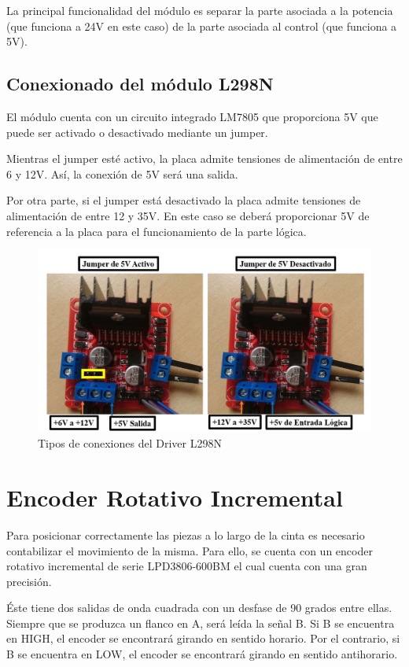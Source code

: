 La principal funcionalidad del módulo es separar la parte asociada
a la potencia (que funciona a 24V en este caso) de la parte asociada
al control (que funciona a 5V).

\subsection{Conexionado del módulo L298N}

El módulo cuenta con un circuito integrado LM7805 que proporciona 5V
que puede ser activado o desactivado mediante un jumper.

Mientras el jumper esté activo, la placa admite tensiones de 
alimentación de entre 6 y 12V. Así, la conexión de 5V será una salida.

Por otra parte, si el jumper está desactivado la placa admite tensiones
de alimentación de entre 12 y 35V. En este caso se deberá proporcionar
5V de referencia a la placa para el funcionamiento de la parte lógica.

\begin{figure}[hbtp]
	\centering
	\includegraphics[scale=0.3]{02-hardware/04-l298n-alimentacion.png}
	\caption{Tipos de conexiones del Driver L298N}
	\label{fig:figura24}
	\end{figure}

\section{Encoder Rotativo Incremental}

Para posicionar correctamente las piezas a lo largo de la cinta es
necesario contabilizar el movimiento de la misma. Para ello, se cuenta
con un encoder rotativo incremental de serie LPD3806-600BM el cual
cuenta con una gran precisión.

Éste tiene dos salidas de onda cuadrada con un desfase de 90 grados
entre ellas. Siempre que se produzca un flanco en A, será leída la 
señal B. Si B se encuentra en HIGH, el encoder se encontrará girando
en sentido horario. Por el contrario, si B se encuentra en LOW, el 
encoder se encontrará girando en sentido antihorario. 

